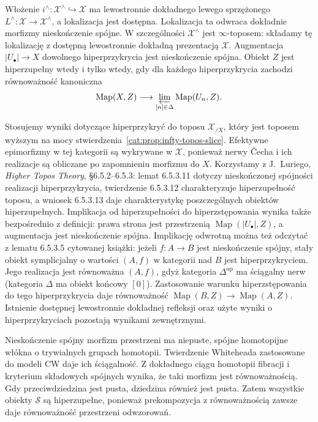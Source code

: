 \begin{twierdzenie}\label{cat:thm:infty-topos-hyperdescent}
Włożenie $i^\wedge:\mathcal X^\wedge\hookrightarrow\mathcal X$ ma lewostronnie dokładnego lewego sprzężonego $L^\wedge:\mathcal X\to\mathcal X^\wedge$, a lokalizacja jest dostępna. Lokalizacja ta odwraca dokładnie morfizmy nieskończenie spójne. W szczególności $\mathcal X^\wedge$ jest $\infty$-toposem: składamy tę lokalizację z dostępną lewostronnie dokładną prezentacją $\mathcal X$. Augmentacja $|U_\bullet|\to X$ dowolnego hiperprzykrycia jest nieskończenie spójna. Obiekt $Z$ jest hiperzupełny wtedy i tylko wtedy, gdy dla każdego hiperprzykrycia zachodzi równoważność kanoniczna
\begin{equation}\label{cat:eq:infty-topos-hyperdescent}
 \operatorname{Map}(X,Z)\longrightarrow
 \varprojlim_{[n]\in\Delta}\operatorname{Map}(U_n,Z).
\end{equation}
\end{twierdzenie}

Stosujemy wyniki dotyczące hiperprzykryć do toposu $\mathcal X_{/X}$, który jest toposem wyższym na mocy stwierdzenia~\ref{cat:prop:infty-topos-slice}. Efektywne epimorfizmy w tej kategorii są wykrywane w $\mathcal X$, ponieważ nerwy Čecha i ich realizacje są obliczane po zapomnieniu morfizmu do $X$. Korzystamy z J.~Luriego, \emph{Higher Topos Theory}, \S6.5.2--6.5.3: lemat 6.5.3.11 dotyczy nieskończonej spójności realizacji hiperprzykrycia, twierdzenie 6.5.3.12 charakteryzuje hiperzupełność toposu, a wniosek 6.5.3.13 daje charakterystykę poszczególnych obiektów hiperzupełnych. Implikacja od hiperzupełności do hiperzstępowania wynika także bezpośrednio z definicji: prawa strona jest przestrzenią $\operatorname{Map}(|U_\bullet|,Z)$, a augmentacja jest nieskończenie spójna. Implikację odwrotną można też odczytać z lematu 6.5.3.5 cytowanej książki: jeżeli $f:A\to B$ jest nieskończenie spójny, stały obiekt symplicjalny o wartości $(A,f)$ w kategorii nad $B$ jest hiperprzykryciem. Jego realizacja jest równoważna $(A,f)$, gdyż kategoria $\Delta^{\mathrm{op}}$ ma ściągalny nerw (kategoria $\Delta$ ma obiekt końcowy $[0]$). Zastosowanie warunku hiperzstępowania do tego hiperprzykrycia daje równoważność $\operatorname{Map}(B,Z)\to\operatorname{Map}(A,Z)$. Istnienie dostępnej lewostronnie dokładnej refleksji oraz użyte wyniki o hiperprzykryciach pozostają wynikami zewnętrznymi.

\begin{przyklad}\label{cat:ex:infty-topos-spaces-hypercomplete}
Nieskończenie spójny morfizm przestrzeni ma niepuste, spójne homotopijne włókna o trywialnych grupach homotopii. Twierdzenie Whiteheada zastosowane do modeli CW daje ich ściągalność. Z dokładnego ciągu homotopii fibracji i kryterium składowych spójnych wynika, że taki morfizm jest równoważnością. Gdy przeciwdziedzina jest pusta, dziedzina również jest pusta. Zatem wszystkie obiekty $\mathcal S$ są hiperzupełne, ponieważ prekompozycja z równoważnością zawsze daje równoważność przestrzeni odwzorowań.
\end{przyklad}


